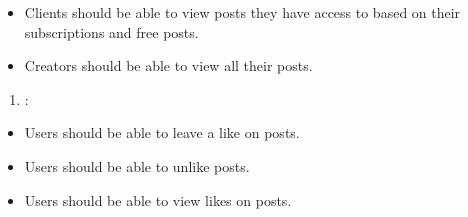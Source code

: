 \documentclass[letterpaper,10pt,english]{sphinxmanual}
\begin{document}
\begin{itemize}
\item {} 
\sphinxAtStartPar
Clients should be able to view posts they have access to based on their subscriptions and free posts.

\item {} 
\sphinxAtStartPar
Creators should be able to view all their posts.

\end{itemize}
\begin{enumerate}
%
\setcounter{enumi}{8}
\item {} 
\sphinxAtStartPar
{}:

\end{enumerate}
\begin{itemize}
\item {} 
\sphinxAtStartPar
Users should be able to leave a like on posts.

\item {} 
\sphinxAtStartPar
Users should be able to unlike posts.

\item {} 
\sphinxAtStartPar
Users should be able to view likes on posts.

\end{itemize}
\end{document}
